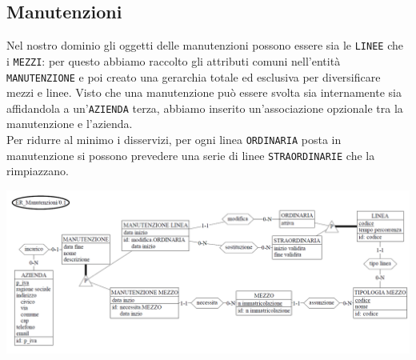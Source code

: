 \documentclass[12pt,a4paper]{report}
\begin{document}
\subsection{Manutenzioni}
Nel nostro dominio gli oggetti delle manutenzioni possono essere sia le \texttt{LINEE} che i \texttt{MEZZI}: per questo abbiamo raccolto gli attributi comuni nell'entità \texttt{MANUTENZIONE} e poi creato una gerarchia totale ed esclusiva per diversificare mezzi e linee.
Visto che una manutenzione può essere svolta sia internamente sia affidandola a un'\texttt{AZIENDA} terza, abbiamo inserito un'associazione opzionale tra la manutenzione e l'azienda. \\
Per ridurre al minimo i disservizi, per ogni linea \texttt{ORDINARIA} posta in manutenzione si possono prevedere una serie di linee \texttt{STRAORDINARIE} che la rimpiazzano. \\
\begin{centering}
\includegraphics[width=1.0\textwidth]{prog_conc/Manutenzioni}
\end{centering}
\end{document}

